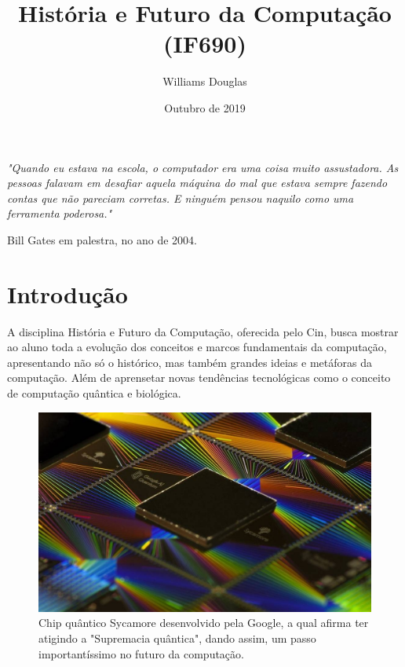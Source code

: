 \documentclass[a4paper, 12pt]{article}
\title{História e Futuro da Computação (IF690)}
\author{Williams Douglas}
\date{Outubro de 2019}
\begin{document}
\maketitle


\emph{"Quando eu estava na escola, o computador era uma coisa muito assustadora. As pessoas falavam em desafiar aquela máquina do mal que estava sempre fazendo contas que não pareciam corretas. E ninguém pensou naquilo como uma ferramenta poderosa."}

Bill Gates em palestra, no ano de 2004.\cite{billgates}

\section{Introdução}
A disciplina História e Futuro da Computação, oferecida pelo Cin, busca mostrar ao aluno toda a evolução dos conceitos e marcos fundamentais da computação, apresentando não só o histórico, mas também grandes ideias e metáforas da computação. Além de aprensetar  novas tendências tecnológicas como o conceito de computação quântica e biológica.



\begin{figure}[h!]
\centering
\includegraphics[scale=0.2]{chipquantico.jpg}
\caption{Chip quântico Sycamore desenvolvido pela Google, a qual afirma ter atigindo a "Supremacia quântica", dando assim, um passo importantíssimo no futuro da computação.\cite{oglobo2019supremacia}}
\label{fig:chipquantico.jpg}
\end{figure}
\end{document}
